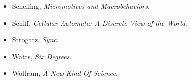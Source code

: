\documentclass[10pt]{book}
\begin{document}
\begin{itemize}
\item Schelling, {\it  Micromotives and Macrobehaviors}.

\item Schiff, {\it  Cellular Automata: A Discrete View of the World}.

\item Strogatz, {\it  Sync}.

\item Watts, {\it  Six Degrees}.

\item Wolfram, {\it  A New Kind Of Science}.

\end{itemize}




\printindex

\clearemptydoublepage

\end{document}

